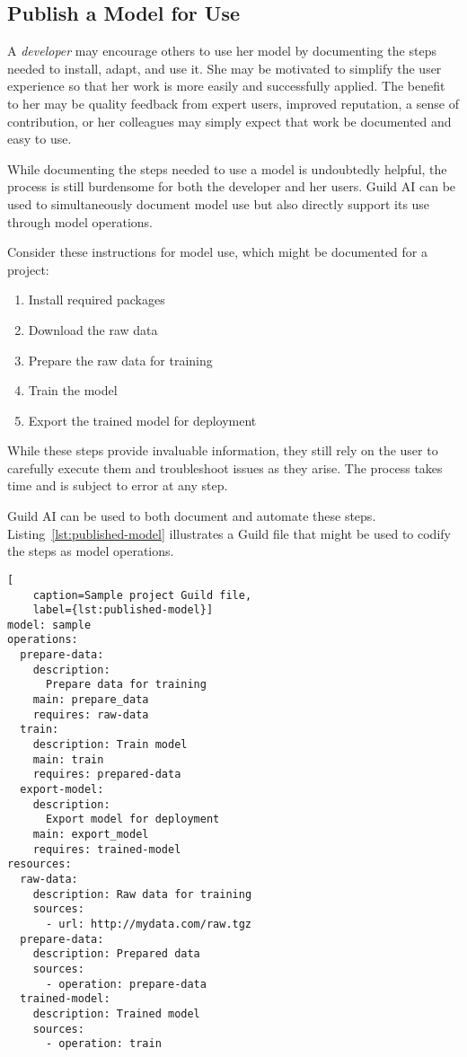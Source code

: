 \documentclass{article}
\begin{document}
\subsection{Publish a Model for Use}
\label{sec:publish-model}

A \emph{developer} may encourage others to use her model by
documenting the steps needed to install, adapt, and use it. She may be
motivated to simplify the user experience so that her work is more
easily and successfully applied. The benefit to her may be quality
feedback from expert users, improved reputation, a sense of
contribution, or her colleagues may simply expect that work be
documented and easy to use.

While documenting the steps needed to use a model is undoubtedly
helpful, the process is still burdensome for both the developer and
her users. Guild AI can be used to simultaneously document model use
but also directly support its use through model operations.

Consider these instructions for model use, which might be documented
for a project:

\setlength{\parindent}{1em}
\begin{enumerate}
\item Install required packages
\item Download the raw data
\item Prepare the raw data for training
\item Train the model
\item Export the trained model for deployment
\end{enumerate}
\setlength{\parindent}{0em}

While these steps provide invaluable information, they still rely on
the user to carefully execute them and troubleshoot issues as they
arise. The process takes time and is subject to error at any step.

Guild AI can be used to both document and automate these
steps. Listing~\ref{lst:published-model} illustrates a Guild file that
might be used to codify the steps as model operations.

\begin{lstlisting}[
    caption=Sample project Guild file,
    label={lst:published-model}]
model: sample
operations:
  prepare-data:
    description:
      Prepare data for training
    main: prepare_data
    requires: raw-data
  train:
    description: Train model
    main: train
    requires: prepared-data
  export-model:
    description:
      Export model for deployment
    main: export_model
    requires: trained-model
resources:
  raw-data:
    description: Raw data for training
    sources:
      - url: http://mydata.com/raw.tgz
  prepare-data:
    description: Prepared data
    sources:
      - operation: prepare-data
  trained-model:
    description: Trained model
    sources:
      - operation: train
\end{lstlisting}
\end{document}

